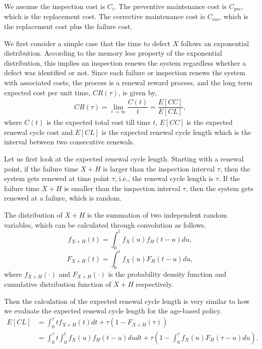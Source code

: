 \documentclass[10pt,a4paper]{article}
\theoremstyle{remark}
\begin{document}
We assume the inspection cost is $C_{i}$. The preventive maintenance cost is $C_{pm}$, which is the replacement cost. The corrective maintenance cost is $C_{cm}$, which is the replacement cost plus the failure cost. 

We first consider a simple case that the time to defect $X$ follows an exponential distribution. According to the memory less property of the exponential distribution, this implies an inspection renews the system regardless whether a defect was identified or not. Since each failure or inspection renews the system with associated costs, the process is a renewal reward process, and the long term expected cost per unit time, $CR(\tau)$, is given by, 
\begin{align} \label{eq:renew}
CR(\tau)=\lim_{t \to \infty}\dfrac{C(t)}{t}=\dfrac{E[CC]}{E[CL]},
\end{align}
where $C(t)$ is the expected total cost till time $t$, $E[CC]$ is the expected renewal cycle cost and $E[CL]$ is the expected renewal cycle length which is the interval between two consecutive renewals. 

Let us first look at the expected renewal cycle length. Starting with a renewal point, if the failure time $X+H$ is larger than the inspection interval $\tau$, then the system gets renewed at time point $\tau$, i.e., the renewal cycle length is $\tau$. If the failure time $X+H$ is smaller than the inspection interval $\tau$, then the system gets renewed at a failure, which is random.

The distribution of $X+H$ is the summation of two independent random variables, which can be calculated through convolution as follows.
\begin{equation*}
f_{X+H}(t)=\int_{0}^{t}f_{X}(u)f_{H}(t-u)du,
\end{equation*}
\begin{equation*}
F_{X+H}(t)=\int_{0}^{t}f_{X}(u)F_{H}(t-u)du,
\end{equation*}
where $f_{X+H}(\cdot)$ and $F_{X+H}(\cdot)$ is the probability density function and cumulative distribution function of $X+H$ respectively.

Then the calculation of the expected renewal cycle length is very similar to how we evaluate the expected renewal cycle length for the age-based policy.
\begin{align} \label{eq:cycle length}
E[CL] & =  \int_{0}^{\tau}t f_{X+H}(t)dt + \tau (1-F_{X+H}(\tau))\nonumber \\
& = \int_{0}^{\tau}t \int_{0}^{t}f_{X}(u)f_{H}(t-u)dudt + \tau (1- \int_{0}^{\tau}f_{X}(u)F_{H}(\tau-u)du).  
\end{align}
\end{document}
